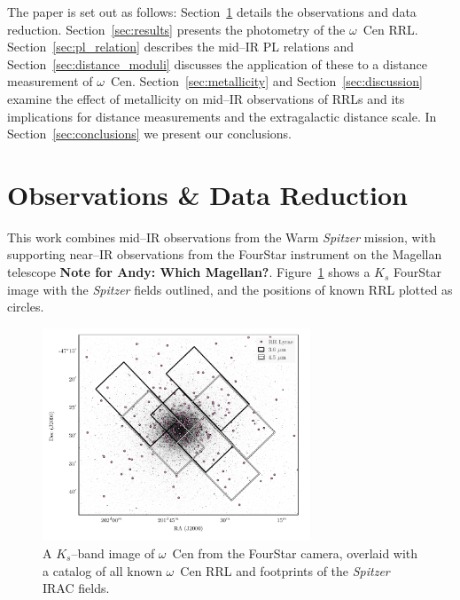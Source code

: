 \documentclass[a4paper,fleqn,usenatbib]{mnras}
\begin{document}
The paper is set out as follows: Section~\ref{sec:observations} details the observations and data reduction. Section~\ref{sec:results} presents the photometry of the $\omega$~Cen RRL. Section~\ref{sec:pl_relation} describes the mid--IR PL relations and Section~\ref{sec:distance_moduli} discusses the application of these to a distance measurement of  $\omega$~Cen. Section~\ref{sec:metallicity} and Section~\ref{sec:discussion} examine the effect of metallicity on mid--IR observations of RRLs and its implications for distance measurements and the extragalactic distance scale. In Section~\ref{sec:conclusions} we present our conclusions.

\section{Observations \& Data Reduction}
\label{sec:observations}
This work combines mid--IR observations from the Warm {\it Spitzer} mission, with supporting near--IR observations from the FourStar instrument on the Magellan telescope \citep{2013PASP..125..654P} {\bf Note for Andy: Which Magellan?}. Figure~\ref{fig:omegaCen_fields} shows a $K_s$ FourStar image with the {\it Spitzer} fields outlined, and the positions of known RRL plotted as circles.

\begin{figure}
\begin{center}
\includegraphics[width=80mm]{final_plots/omegacen_coverage_map.pdf}
\caption{A $K_s$--band image of $\omega$~Cen from the FourStar camera, overlaid with a catalog of all known $\omega$~Cen RRL \citep{2004A&A...424.1101K} and footprints of the {\it Spitzer} IRAC fields.}
\label{fig:omegaCen_fields}
\end{center}
\end{figure}
\end{document}
